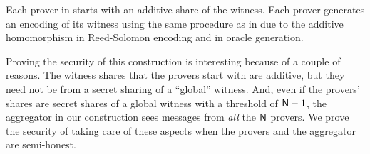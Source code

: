 Each prover in \dpname{} starts with an additive share of the witness. Each prover generates an encoding of its witness using the same procedure as in \name{} due to the additive homomorphism in Reed-Solomon encoding and in oracle generation. 

Proving the security of this construction is interesting because of a couple of reasons. The witness shares that the provers start with are additive, but they need not be from a secret sharing of a ``global'' witness. And, even if the provers' shares are secret shares of a global witness with a threshold of $\mathsf{N}-1$, the aggregator in our construction sees messages from \textit{all} the $\mathsf{N}$ provers. We prove the security of \dpname{} taking care of these aspects when the provers and the aggregator are semi-honest.

